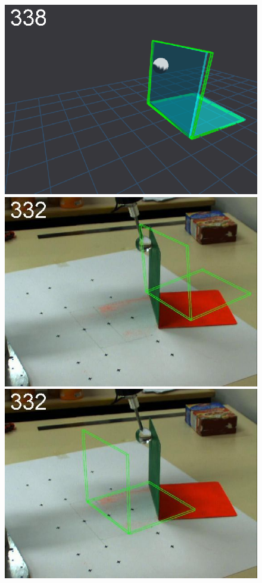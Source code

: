 \begin{figure}[tb]
{\includegraphics[width=\imgBXwid]{images/B1_3exp_20_5}
\includegraphics[width=\imgBXwid]{images/B2_2exp_58_5}
\includegraphics[width=\imgBXwid]{images/B2_1exp_58_5}
}
\end{figure}

